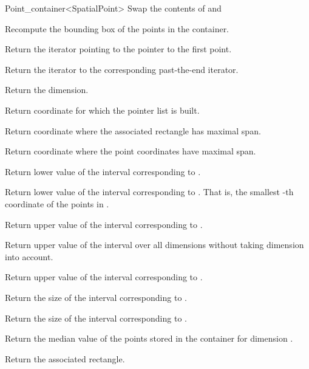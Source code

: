 \begin{ccRefClass}{Point_container<SpatialPoint>}
{Swap the contents of  and }


{Recompute the bounding box of the points in the container.}


{
Return the iterator pointing to the pointer to the first point.
}

{
Return the iterator to the corresponding past-the-end iterator.
}

{
Return the dimension.
}

{
Return coordinate for which the pointer list is built.
}

{
Return coordinate where the associated rectangle has maximal span.
}

{
Return coordinate where the point coordinates have maximal span.
}

{
Return lower value of the interval corresponding to
.
}


{
Return lower value of the interval corresponding to
. That is, the smallest
-th coordinate of the points in
.
}


{
Return upper value of the interval corresponding to
.
}

{
Return upper value of the interval over all dimensions
without taking dimension  into account.
}

{
Return upper value of the interval corresponding to
.
}

{
Return the size of the interval corresponding to .
}

{
Return the size of the interval corresponding to .
}

{
Return the median value of the points stored in the container for
dimension .
}

{Return the associated rectangle.}


\end{ccRefClass}
